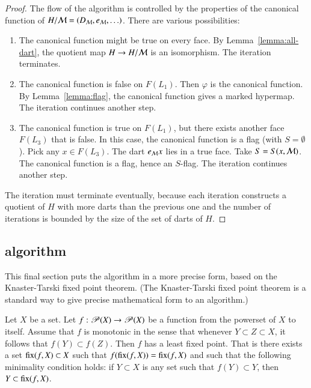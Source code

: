 \begin{proof}
The flow of the algorithm is controlled by the properties of the
canonical function of $H/{\cal M}=(D_{\cal M},e_{\cal M},\ldots)$.
There are various possibilities:
\begin{enumerate}
\item The canonical function might be true on every face.  By
Lemma~\ref{lemma:all-dart}, the quotient map $H\to H/{\cal M}$ is an
isomorphism.  The iteration terminates.
\item The canonical function is false on $F(L_1)$.  Then $\varphi$ is
the canonical function.  By Lemma~\ref{lemma:flag}, the canonical function
gives a marked hypermap.  The iteration
continues another step.
\item The canonical function is true on $F(L_1)$, but there exists
another face $F(L_3)$ that is false.  In this case, the canonical
function is a flag (with $S=\emptyset$).  Pick any $x\in F(L_3)$.
The dart $e_{\cal M} x$ lies in a true face.  Take $S=S(x,{\cal
M})$.  The canonical function is a flag, hence an $S$-flag.  The
iteration continues another step.
\end{enumerate}

The iteration must terminate eventually, because each iteration
constructs a quotient of $H$ with more darts than the previous one and
the number of iterations is bounded by the size of the set of darts of
$H$.
\end{proof}

\subsection{algorithm}

This final section puts the algorithm in a more precise form, based on
the Knaster-Tarski fixed point theorem.  (The Knaster-Tarski fixed
point theorem is a standard way to give precise mathematical form to
an algorithm.)

\begin{lemma}   
Let $X$ be a set.  Let $f:{\mathscr P}(X)\to {\mathscr P}(X)$ be a
function from the powerset of $X$ to itself.  Assume that $f$ is
monotonic in the sense that whenever $Y\subset Z\subset X$, it
follows that $f(Y) \subset f(Z)$.  Then $f$ has a least fixed point.
That is there exists a set ${\operatorname{fix}}(f,X)\subset X$ such that
$f({\operatorname{fix}}(f,X)) = {\operatorname{fix}}(f,X)$ and such that the following
minimality condition holds: if $Y\subset X$ is any set such that
$f(Y) \subset Y$, then $Y\subset {\operatorname{fix}}(f,X)$.
\end{lemma}
%
%
%
%
%

